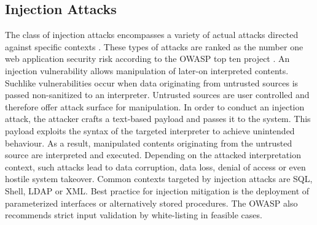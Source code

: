 \subsection{Injection Attacks}
The class of injection attacks encompasses a variety of actual attacks directed against specific contexts \cite{OWASP:2013}. These types of attacks are ranked as the number one web application security risk according to the OWASP top ten project \cite{OWASP:2013b}. An injection vulnerability allows manipulation of later-on interpreted contents. Suchlike vulnerabilities occur when data originating from untrusted sources is passed non-sanitized to an interpreter. Untrusted sources are user controlled and therefore offer attack surface for manipulation. In order to conduct an injection attack, the attacker crafts a text-based payload and passes it to the system. This payload exploits the syntax of the targeted interpreter to achieve unintended behaviour. As a result, manipulated contents originating from the untrusted source are interpreted and executed. Depending on the attacked interpretation context, such attacks lead to data corruption, data loss, denial of access or even hostile system takeover. Common contexts targeted by injection attacks are SQL, Shell, LDAP or XML. Best practice for injection mitigation is the deployment of parameterized interfaces or alternatively stored procedures. The OWASP also recommends strict input validation by white-listing in feasible cases.
